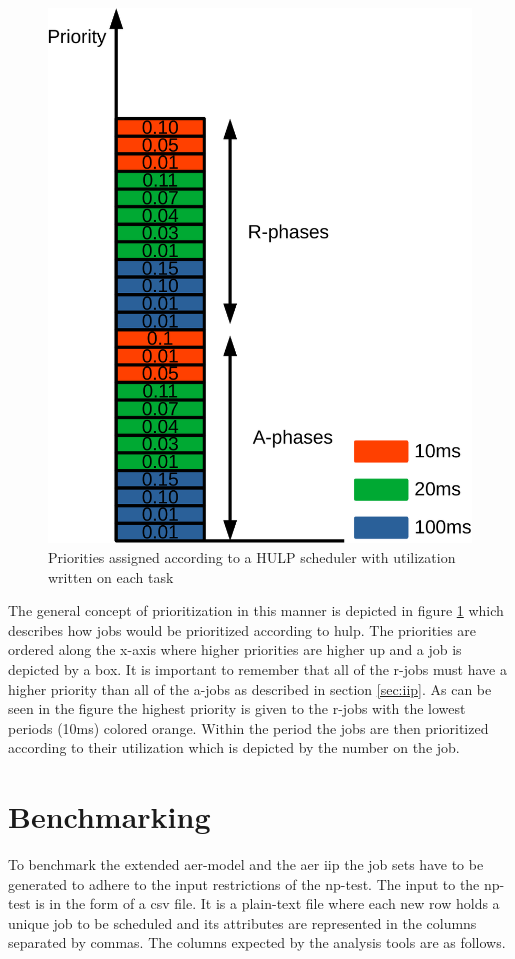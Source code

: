 \documentclass{kththesis}
\begin{document}
\begin{figure}

    \centering

    \includegraphics[width=0.5\linewidth]{images/scheduling_priorities.pdf}

    \caption{Priorities assigned according to a HULP scheduler with utilization written on each task}

    \label{fig:scheduling_priorities}

\end{figure}

The general concept of prioritization in this manner is depicted in figure
\ref{fig:scheduling_priorities} which describes how jobs would be prioritized according to
\acrshort{hulp}. The priorities are ordered along the x-axis where higher priorities are higher up
and a job is depicted by a box. It is important to remember that all of the \acrshort{r}-jobs must
have a higher priority than all of the \acrshort{a}-jobs as described in section \ref{sec:iip}. As
can be seen in the figure the highest priority is given to the \acrshort{r}-jobs with the lowest
periods (10ms) colored orange. Within the period the jobs are then prioritized according to their
utilization which is depicted by the number on the job. 




\section{Benchmarking}\label{sec:benchmarking}

To benchmark the extended \acrshort{aer}-model and the \acrshort{aer} \acrshort{iip} the job sets
have to be generated to adhere to the input restrictions of the np-test. The input to the
\acrshort{np}-test is in the form of a \acrfull{csv} file. It is a plain-text file where each new
row holds a unique job to be scheduled and its attributes are represented in the columns separated
by commas. The columns expected by the analysis tools are as follows.
\end{document}
